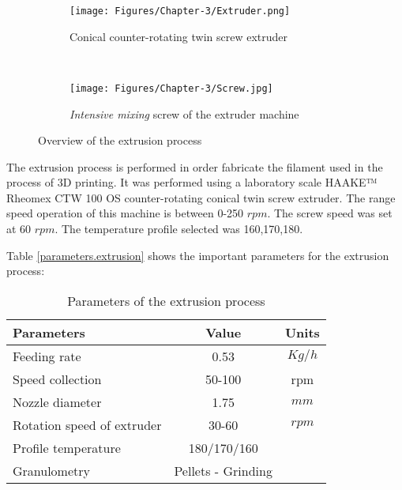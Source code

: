 \begin{enumerate}[leftmargin=0in, label=\emph{\alph*}.]
	
	
	\begin{figure} [H]
		\centering
		
		\begin{subfigure}[t]{0.6\textwidth}
			\texttt{[image: Figures/Chapter-3/Extruder.png]}
			\caption{Conical counter-rotating twin screw extruder}
			\label{extruder}
		\end{subfigure}
		~
		\begin{subfigure}[t]{0.3\textwidth}
			\texttt{[image: Figures/Chapter-3/Screw.jpg]}
			\caption{\emph{Intensive mixing} screw of the extruder machine}
			\label{screw}
		\end{subfigure}	
		
		\caption{Overview of the extrusion process}
		\label{extrusion.machine}
	\end{figure}
		
The extrusion process  is performed in order fabricate the filament used in the process of 3D printing.
It was performed using a laboratory scale HAAKE™ Rheomex CTW 100 OS counter-rotating conical twin screw extruder. 
The range speed operation of this machine is between 0-250 $rpm$. The screw speed was set at 60 $rpm$.
The temperature profile selected was 160,170,180\Celsius .

				
Table \ref{parameters.extrusion} shows the important parameters for the extrusion process:
	
	\begin{table}[H]
		\centering
		\caption{Parameters of the extrusion process}
		\begin{tabular}{lcc}
			\toprule
			\textbf{Parameters } & \textbf{Value } & \textbf{Units} \\
			\midrule
			Feeding rate     	& 0.53 	&	$Kg/h$			\\
			Speed collection		& 50-100	& rpm			\\
			Nozzle diameter	          & 1.75  & $mm$		\\
			Rotation speed of extruder	& 30-60 	& $rpm$ 				\\
			Profile temperature  	     & 180/170/160  &	\Celsius			\\
			Granulometry & Pellets - Grinding & \\
			

\end{tabular}
\end{table}
\end{enumerate}
